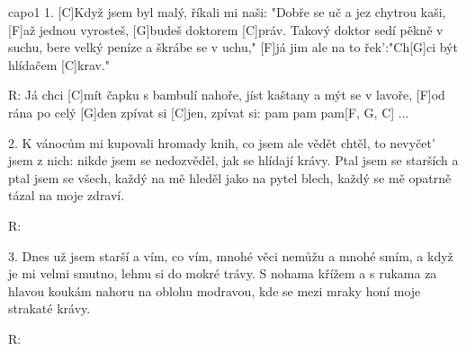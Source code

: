 \hfill capo1
1. [C]Když jsem byl malý, říkali mi naši:
"Dobře se uč a jez chytrou kaši,
[F]až jednou vyrosteš, [G]budeš doktorem [C]práv.
Takový doktor sedí pěkně v suchu,
bere velký peníze a škrábe se v uchu,"
[F]já jim ale na to řek':"Ch[G]ci být hlídačem [C]krav."

R: Já chci [C]mít čapku s bambulí nahoře,
jíst kaštany a mýt se v lavoře,
[F]od rána po celý [G]den zpívat si [C]jen,
zpívat si: pam pam pam[F, G, C] ...

2. K vánocům mi kupovali hromady knih,
co jsem ale vědět chtěl, to nevyčet' jsem z nich:
nikde jsem se nedozvěděl, jak se hlídají krávy.
Ptal jsem se starších a ptal jsem se všech,
každý na mě hleděl jako na pytel blech,
každý se mě opatrně tázal na moje zdraví.

R:

3. Dnes už jsem starší a vím, co vím,
mnohé věci nemůžu a mnohé smím,
a když je mi velmi smutno, lehnu si do mokré trávy.
S nohama křížem a s rukama za hlavou
koukám nahoru na oblohu modravou,
kde se mezi mraky honí moje strakaté krávy.

R:
